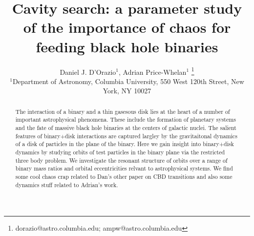 \documentclass[usenatbib]{mn2e}
\begin{document}
\title{Cavity search: a parameter study of the importance of chaos for feeding black hole binaries}
\author[D. J. D'Orazio, Adrian Price-Whelan]{Daniel J. D'Orazio$^1$, Adrian Price-Whelan$^1$  
    \thanks{dorazio@astro.columbia.edu; ampw@astro.columbia.edu}\\
     $^1$Department of Astronomy, Columbia University, 550 West 120th Street, New York, NY 10027 
}




\maketitle


\begin{abstract}
The interaction of a binary and a thin gasesous disk lies at the heart
of a number of important astrophysical phenomena. These include the
formation of planetary systems and the fate of massive black hole
binaries at the centers of galactic nuclei.
The salient features of binary+disk interactions are captured largley
by the gravitaitonal dynamics of a disk of particles in the plane of
the binary.
Here we gain insight into binary+disk dynamics by studying orbits of
test particles in the binary plane via the restricted three body
problem.
We investigate the resonant structure of orbits over a range of binary
mass ratios and orbital eccentricities relvant to astrophysical
systems.
We find some cool chaos crap related to Dan's other paper on CBD
transitions and also some dynamics stuff related to Adrian's work.


\end{abstract}
\end{document}
